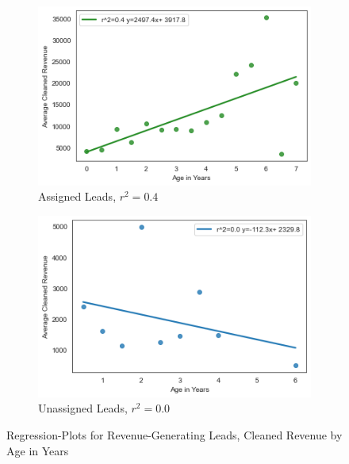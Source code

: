 \documentclass[11pt]{article}
\begin{document}
\begin{figure}[h]
    \centering
    \begin{subfigure}[l]{0.45\textwidth}
         \centering
        \includegraphics[scale=.5]{Images/assigned_regplot.png}
         \caption{Assigned Leads, $r^2=0.4$}
         \label{fig:revenue distribution}
     \end{subfigure}
       \begin{subfigure}[r]{0.4\textwidth}
         \centering
       \includegraphics[scale=.5]{Images/Unassigned_regplot.png}
         \caption{Unassigned Leads, $r^2=0.0$}
         \label{fig:date distriburtion}
     \end{subfigure}
    \caption{Regression-Plots for Revenue-Generating Leads, Cleaned Revenue by Age in Years}
    \label{fig:assigned_lead_rev}
\end{figure}

\newpage 
\end{document}
